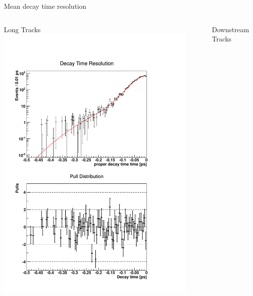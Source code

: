 \documentclass{beamer}
\begin{document}
	
	\begin{frame}{Mean decay time resolution}
		\begin{columns}
	\begin{block}{Long Tracks}
	\centering
	\includegraphics[width=0.92\textwidth]{resolution_lt}
	\end{block}
	\begin{block}{Downstream Tracks}
	\centering

\end{block}
\end{columns}
\end{frame}
\end{document}
